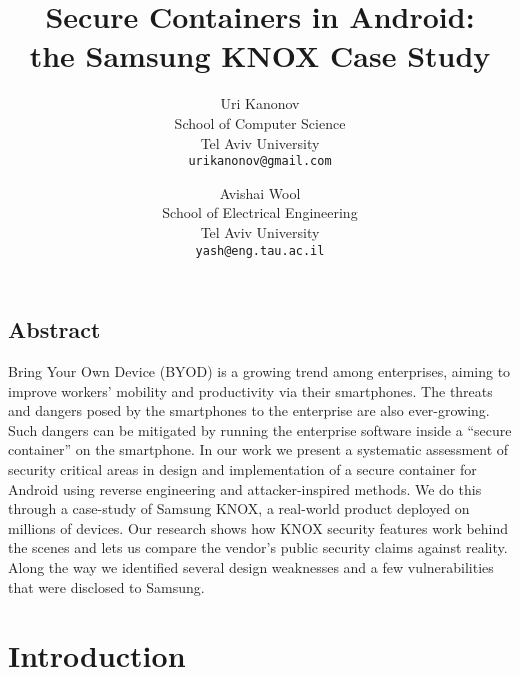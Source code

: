 \documentclass[11pt]{article}
\begin{document}
\date{}

\title{\Large \bf Secure Containers in Android: \\the Samsung KNOX Case Study}

\author{
{\rm Uri Kanonov} \\
School of Computer Science \\
Tel Aviv University \\
\texttt{urikanonov@gmail.com}
\and
{\rm Avishai Wool} \\
School of Electrical Engineering \\
Tel Aviv University \\
\texttt{yash@eng.tau.ac.il} 
} 

\maketitle

\subsection*{Abstract}
Bring Your Own Device (BYOD) is a growing trend among enterprises, aiming to improve workers' mobility and productivity via their smartphones.
The threats and dangers posed by the smartphones to the enterprise are also ever-growing. 
Such dangers can be mitigated by running the enterprise software inside a ``secure container'' on the smartphone.
In our work we present a systematic assessment of security critical areas in design and implementation of a secure container for Android
using reverse engineering and attacker-inspired methods.
We do this through a case-study of Samsung KNOX, a real-world product deployed on millions of devices. 
Our research shows how KNOX security features work behind the scenes and lets us compare the vendor's public security claims against reality. 
Along the way we identified several design weaknesses and a few vulnerabilities that were disclosed to Samsung.
 \section{Introduction}
\end{document}
